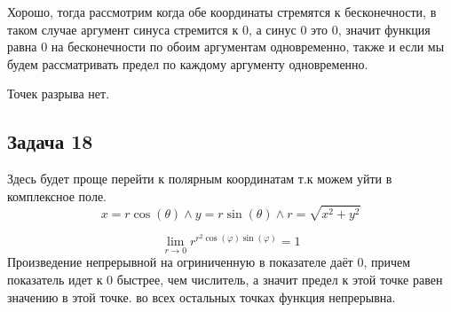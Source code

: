 \documentclass[a4paper,12pt]{article}
\begin{document}
Хорошо, тогда рассмотрим когда обе координаты стремятся к бесконечности, в таком случае аргумент синуса стремится к 0, а синус 0 это 0, значит функция равна 0 на бесконечности по обоим аргументам одновременно, также и если мы будем рассматривать предел по каждому аргументу одновременно. 

Точек разрыва нет.

\subsection{Задача 18}
Здесь будет проще перейти к полярным координатам т.к можем уйти в комплексное поле.
\[
x = r\cos(\theta) \land y = r\sin(\theta) \land r = \sqrt{x^2+y^2} 
\]

\[
\lim_{r \to 0} r^{r^2\cos(\varphi)\sin(\varphi)}=1
\]
Произведение непрерывной на огриниченную в показателе даёт 0, причем показатель идет к 0 быстрее, чем числитель, а значит предел к этой точке равен значению в этой точке. во всех остальных точках функция непрерывна.
\end{document}
